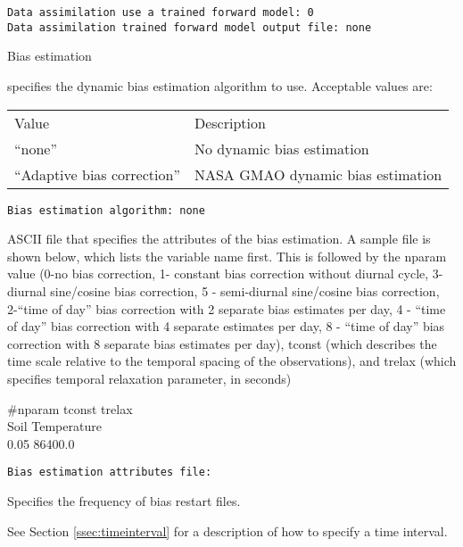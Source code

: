  \begin{Verbatim}[frame=single]
Data assimilation use a trained forward model: 0
Data assimilation trained forward model output file: none
 \end{Verbatim}

 
 Bias estimation

  specifies the dynamic bias estimation
 algorithm to use.
 Acceptable values are:

 \begin{tabular}{ll}
 Value                        & Description                       \\
 ``none''                     & No dynamic bias estimation        \\
 ``Adaptive bias correction'' & NASA GMAO dynamic bias estimation \\
 \end{tabular}
 

 \begin{Verbatim}[frame=single]
Bias estimation algorithm: none
 \end{Verbatim}

 
  ASCII file that
 specifies the attributes of the bias estimation. A
 sample file is shown below, which lists the variable
 name first. This is followed by the nparam value 
 (0-no bias correction, 1- constant bias correction without
 diurnal cycle, 3- diurnal sine/cosine bias correction, 
 5 - semi-diurnal sine/cosine bias correction, 
 2-``time of day'' bias correction with 2 separate bias
 estimates per day, 4 - ``time of day'' bias correction with 
 4 separate estimates per day, 8 - ``time of day'' bias 
 correction with 8 separate bias estimates per day), 
 tconst (which describes the time scale relative to the 
 temporal spacing of the observations), and trelax
 (which specifies temporal relaxation parameter, in seconds)

 \#nparam  tconst trelax \\
 \indent Soil Temperature        \\
     0.05    86400.0
 

 \begin{Verbatim}[frame=single]
Bias estimation attributes file:
 \end{Verbatim}

 
  Specifies the frequency
 of bias restart files.

 See Section \ref{ssec:timeinterval} for a description
 of how to specify a time interval.
 

